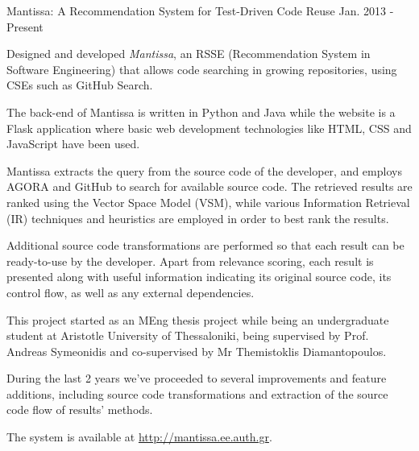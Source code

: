 \begin{cventries}
  \cventry
    {Mantissa: A Recommendation System for Test-Driven Code Reuse} %
	{}
	{}
    {Jan. 2013 - Present} %
    {
      \begin{cvitems} %
        \item {Designed and developed \textit{Mantissa}, an RSSE (Recommendation System in Software Engineering) that allows code searching in growing repositories, using CSEs such as GitHub Search.} 
        \item{The back-end of Mantissa is written in Python and Java while the website is a Flask application where basic web development technologies like HTML, CSS and JavaScript have been used.}
        \item {Mantissa extracts the query from the source code of the developer, and employs AGORA and GitHub to search for available source code. The retrieved results are ranked using the Vector Space Model (VSM), while various Information Retrieval (IR) techniques and heuristics are employed in order to best rank the results.}
		\item {Additional source code transformations are performed so that each result can be ready-to-use by the developer. Apart from relevance scoring, each result is presented along with useful information indicating its original source code, its control flow, as well as any external dependencies.}
		\item {This project started as an MEng thesis project while being an undergraduate student at Aristotle University of Thessaloniki, being supervised by Prof. Andreas Symeonidis and co-supervised by Mr Themistoklis Diamantopoulos.}
		\item{During the last 2 years we've proceeded to several improvements and feature additions, including source code transformations and extraction of the source code flow of results' methods.}
		\item {The system is available at \url{http://mantissa.ee.auth.gr}.}
      \end{cvitems}
    }
\end{cventries}
